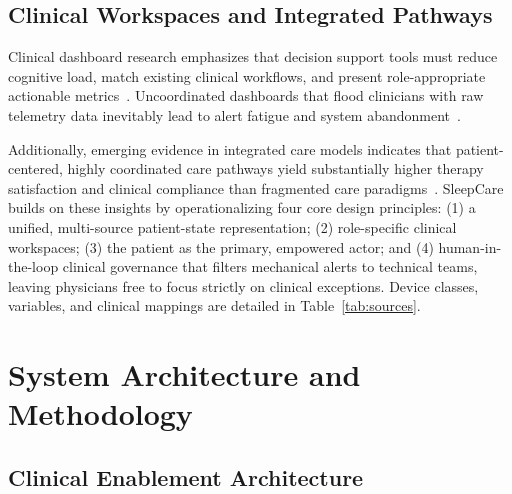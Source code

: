 \documentclass[conference]{IEEEtran}
\begin{document}
\subsection{Clinical Workspaces and Integrated Pathways}
Clinical dashboard research emphasizes that decision support tools must reduce cognitive load, match existing clinical workflows, and present role-appropriate actionable metrics~\cite{dowding2015}. Uncoordinated dashboards that flood clinicians with raw telemetry data inevitably lead to alert fatigue and system abandonment~\cite{dowding2015}. 

Additionally, emerging evidence in integrated care models indicates that patient-centered, highly coordinated care pathways yield substantially higher therapy satisfaction and clinical compliance than fragmented care paradigms~\cite{salinas2025}. SleepCare builds on these insights by operationalizing four core design principles: (1) a unified, multi-source patient-state representation; (2) role-specific clinical workspaces; (3) the patient as the primary, empowered actor; and (4) human-in-the-loop clinical governance that filters mechanical alerts to technical teams, leaving physicians free to focus strictly on clinical exceptions. Device classes, variables, and clinical mappings are detailed in Table~\ref{tab:sources}.

\section{System Architecture and Methodology}

\subsection{Clinical Enablement Architecture}
\end{document}
